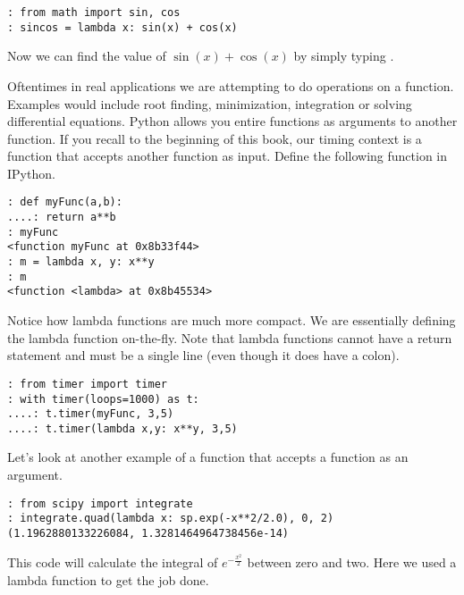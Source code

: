 \begin{lstlisting}
: from math import sin, cos
: sincos = lambda x: sin(x) + cos(x)
\end{lstlisting}

Now we can find the value of $\sin(x) + \cos(x)$ by simply typing .

% 
% 

Oftentimes in real applications we are attempting to do operations on a function. Examples would include root finding, minimization, integration or solving differential equations. Python allows you entire functions as arguments to another function.  If you recall to the beginning of this book, our timing context is a function that accepts another function as input.  Define the following function in IPython.
\begin{lstlisting}
: def myFunc(a,b):
....: return a**b
: myFunc
<function myFunc at 0x8b33f44>
: m = lambda x, y: x**y
: m
<function <lambda> at 0x8b45534>
\end{lstlisting}

Notice how lambda functions are much more compact. We are essentially defining the lambda function on-the-fly.  Note that lambda functions cannot have a return statement and must be a single line (even though it does have a colon).
\begin{lstlisting}
: from timer import timer
: with timer(loops=1000) as t:
....: t.timer(myFunc, 3,5)
....: t.timer(lambda x,y: x**y, 3,5)
\end{lstlisting}

Let's look at another example of a function that accepts a function as an argument.
\begin{lstlisting}
: from scipy import integrate
: integrate.quad(lambda x: sp.exp(-x**2/2.0), 0, 2)
(1.1962880133226084, 1.3281464964738456e-14)
\end{lstlisting}

This code will calculate the integral of $e^{-\frac{x^2}{2}}$ between zero and two. Here we used a lambda function to get the job done. 

